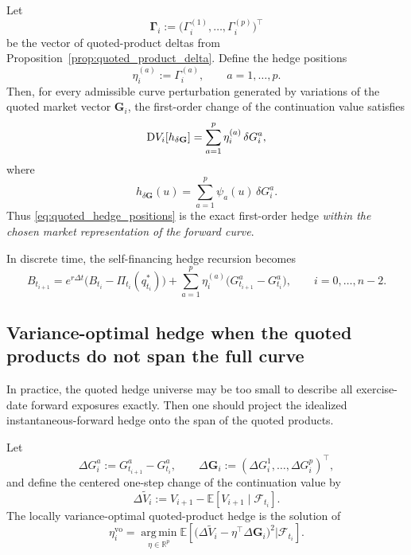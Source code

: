 \documentclass[10pt,a4paper,reqno]{amsart}
\newcommand{\<}{\langle}
\renewcommand{\>}{\rangle}
\theoremstyle{example}
\newcommand*\DD{\mathop{}\!\textnormal{D}}
\begin{document}
Let
\[
\boldsymbol{\Gamma}_i
:=
\big(\Gamma_i^{(1)},\dots,\Gamma_i^{(p)}\big)^\top
\]
be the vector of quoted-product deltas from Proposition~\ref{prop:quoted_product_delta}.
Define the hedge positions
\begin{equation}
\label{eq:quoted_hedge_positions}
\eta_i^{(a)} := \Gamma_i^{(a)},
\qquad a=1,\dots,p.
\end{equation}
Then, for every admissible curve perturbation generated by variations of the quoted market vector
$\mathbf{G}_i$, the first-order change of the continuation value satisfies
\begin{equation}
\label{eq:exact_first_order_quoted}
\DD V_i[h_{\delta \mathbf{G}}]
=
\sum_{a=1}^p \eta_i^{(a)}\,\delta G_i^a,
\end{equation}
where
\[
h_{\delta \mathbf{G}}(u)
=
\sum_{a=1}^p \psi_a(u)\,\delta G_i^a.
\]
Thus \eqref{eq:quoted_hedge_positions} is the exact first-order hedge \emph{within the chosen market
representation of the forward curve}.

In discrete time, the self-financing hedge recursion becomes
\begin{equation}
\label{eq:self_financing_quoted}
B_{t_{i+1}}
=
e^{r\Delta t}
\Big(
B_{t_i}-\Pi_{t_i}(q_{t_i}^*)
\Big)
+
\sum_{a=1}^p
\eta_i^{(a)}
\Big(
G_{t_{i+1}}^a-G_{t_i}^a
\Big),
\qquad i=0,\dots,n-2.
\end{equation}

\subsection{Variance-optimal hedge when the quoted products do not span the full curve}

In practice, the quoted hedge universe may be too small to describe all exercise-date forward exposures
exactly. Then one should project the idealized instantaneous-forward hedge onto the span of the quoted
products.

Let
\[
\Delta G_i^a := G_{t_{i+1}}^a-G_{t_i}^a,
\qquad
\Delta \mathbf{G}_i := (\Delta G_i^1,\dots,\Delta G_i^p)^\top,
\]
and define the centered one-step change of the continuation value by
\[
\Delta \widetilde V_i
:=
V_{i+1}-\mathbb{E}[V_{i+1}\mid \mathcal{F}_{t_i}].
\]
The locally variance-optimal quoted-product hedge is the solution of
\begin{equation}
\label{eq:vo_problem}
\eta_i^{\mathrm{vo}}
=
\operatorname*{arg\,min}_{\eta\in\mathbb{R}^p}
\mathbb{E}\!\left[
\big(
\Delta \widetilde V_i-\eta^\top \Delta \mathbf{G}_i
\big)^2
\Big|
\mathcal{F}_{t_i}
\right].
\end{equation}
\end{document}
